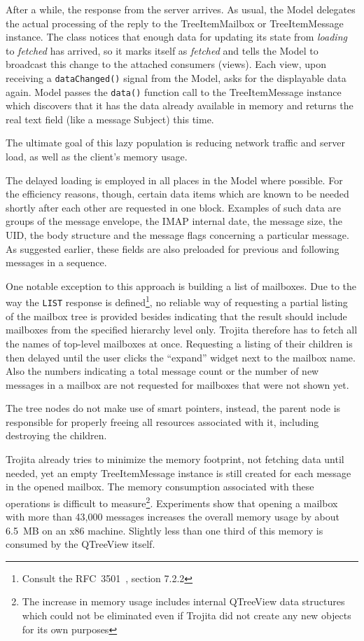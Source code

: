 \documentclass[12pt,notitlepage]{report}
\newcommand{\trojita}{Trojita\xspace}
\begin{document}
After a while, the response from the server arrives.  As usual, the Model
delegates the actual processing of the reply to the TreeItemMailbox or
TreeItemMessage instance.  The class notices that enough data for updating
its state from {\em loading} to {\em fetched} has arrived, so it marks itself as
{\em fetched} and tells the Model to broadcast this change to the attached
consumers (views).  Each view, upon receiving a {\tt dataChanged()} signal from
the Model, asks for the displayable data again.  Model passes the {\tt data()} function call
to the TreeItemMessage instance which discovers that it has the data already
available in memory and returns the real text field (like a message Subject)
this time.

The ultimate goal of this lazy population is reducing network traffic and server
load, as well as the client's memory usage.

The delayed loading is employed in all places in the Model where possible.  For
the efficiency reasons, though, certain data items which are known to be needed
shortly after each other are requested in one block.  Examples of such data are
groups of the message envelope, the IMAP internal date, the message size, the
UID, the body structure and the message flags concerning a particular message.
As suggested earlier, these fields are also preloaded for previous and following
messages in a sequence.

One notable exception to this approach is building a list of mailboxes.  Due to
the way the {\tt LIST} response is defined\footnote{Consult the
RFC~3501~\cite{rfc-imap}, section 7.2.2}, no reliable way of requesting a
partial listing of the mailbox tree is provided besides indicating that the
result should include mailboxes from the specified hierarchy level only.
\trojita therefore has to fetch all the names of top-level mailboxes at once.
Requesting a listing of their children is then delayed until the user clicks the
``expand'' widget next to the mailbox name.  Also the numbers
indicating a total message count or the number of new messages in a mailbox are
not requested for mailboxes that were not shown yet.

The tree nodes do not make use of smart pointers, instead, the parent node is
responsible for properly freeing all resources associated with it, including
destroying the children.

\trojita already tries to minimize the memory footprint, not fetching data
until needed, yet an empty TreeItemMessage instance is still created for each
message in the opened mailbox.  The memory consumption associated with these
operations is difficult to measure\footnote{The increase in memory usage
includes internal QTreeView data structures which could not be eliminated even
if \trojita did not create any new objects for its own purposes}.  Experiments
show that opening a mailbox with more than 43,000 messages increases the
overall memory usage by about 6.5~MB on an x86 machine.  Slightly less than one
third of this memory is consumed by the QTreeView itself.
\end{document}
